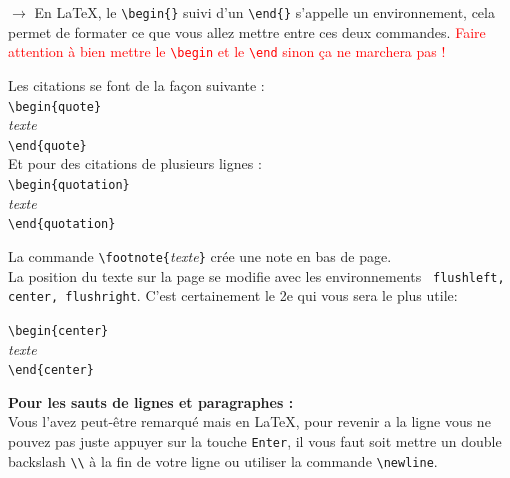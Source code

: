 \documentclass[11pt]{article}				%
\newcommand{\tb}{\textbackslash}
\begin{document}
$\rightarrow$ En LaTeX, le \texttt{\tb begin\{\}} suivi d'un \texttt{\tb end\{\}} s'appelle un environnement, cela permet de formater ce que vous allez mettre entre ces deux commandes. \textcolor{red}{Faire attention à bien mettre le \texttt{\tb begin} et le \texttt{\tb end} sinon ça ne marchera pas !} \\


\begin{multicols}{2}


\noindent Les citations se font de la façon suivante : \\
\verb?\begin{quote}? \\
\emph{texte} \\
\verb?\end{quote}? \\

\noindent Et pour des citations de plusieurs lignes : \\
\verb?\begin{quotation}? \\
\emph{texte} \\
\verb?\end{quotation}? 

\columnbreak

\noindent La commande \verb?\footnote{?\emph{texte}\verb?}? crée une note en bas de page. \\


\noindent La position du texte sur la page se modifie avec les environnements \texttt{ flushleft, center,  flushright}. C'est certainement le 2e qui vous sera le plus utile: 
\begin{flushleft}
\verb?\begin{center}? \\
\emph{texte}\\
\verb?\end{center}? 
\end{flushleft}

\end{multicols}

\textbf{Pour les sauts de lignes et paragraphes :} \\

Vous l'avez peut-être remarqué mais en LaTeX, pour revenir a la ligne vous ne pouvez pas juste appuyer sur la touche \texttt{Enter}, il vous faut soit mettre un double backslash \texttt{\tb \tb} à la fin de votre ligne ou utiliser la commande \texttt{\tb newline}.
\end{document}
